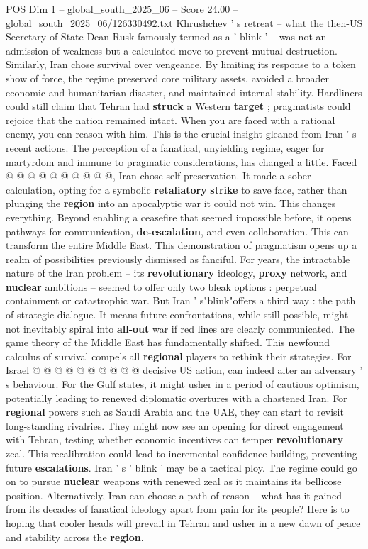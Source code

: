 \begin{textsample}{POS Dim 1 – global\_south\_2025\_06 – Score 24.00 – global\_south\_2025\_06/126330492.txt}
Khrushchev ' s retreat -- what the then-US Secretary of State Dean Rusk famously termed as a ' blink ' -- was not an admission of weakness but a calculated move to prevent mutual destruction.
Similarly, Iran chose survival over vengeance.
By limiting its response to a token show of force, the regime preserved core military assets, avoided a broader economic and humanitarian disaster, and maintained internal stability.
Hardliners could still claim that Tehran had \textbf{struck} a Western \textbf{target} ; pragmatists could rejoice that the nation remained intact.
When you are faced with a rational enemy, you can reason with him.
This is the crucial insight gleaned from Iran ' s recent actions.
The perception of a fanatical, unyielding regime, eager for martyrdom and immune to pragmatic considerations, has changed a little.
Faced @ @ @ @ @ @ @ @ @ @, Iran chose self-preservation.
It made a sober calculation, opting for a symbolic \textbf{retaliatory} \textbf{strike} to save face, rather than plunging the \textbf{region} into an apocalyptic war it could not win.
This changes everything.
Beyond enabling a ceasefire that seemed impossible before, it opens pathways for communication, \textbf{de-escalation}, and even collaboration.
This can transform the entire Middle East.
This demonstration of pragmatism opens up a realm of possibilities previously dismissed as fanciful.
For years, the intractable nature of the Iran problem -- its \textbf{revolutionary} ideology, \textbf{proxy} network, and \textbf{nuclear} ambitions -- seemed to offer only two bleak options : perpetual containment or catastrophic war.
But Iran ' s"blink"offers a third way : the path of strategic dialogue.
It means future confrontations, while still possible, might not inevitably spiral into \textbf{all-out} war if red lines are clearly communicated.
The game theory of the Middle East has fundamentally shifted.
This newfound calculus of survival compels all \textbf{regional} players to rethink their strategies.
For Israel @ @ @ @ @ @ @ @ @ @ decisive US action, can indeed alter an adversary ' s behaviour.
For the Gulf states, it might usher in a period of cautious optimism, potentially leading to renewed diplomatic overtures with a chastened Iran.
For \textbf{regional} powers such as Saudi Arabia and the UAE, they can start to revisit long-standing rivalries.
They might now see an opening for direct engagement with Tehran, testing whether economic incentives can temper \textbf{revolutionary} zeal.
This recalibration could lead to incremental confidence-building, preventing future \textbf{escalations}.
Iran ' s ' blink ' may be a tactical ploy.
The regime could go on to pursue \textbf{nuclear} weapons with renewed zeal as it maintains its bellicose position.
Alternatively, Iran can choose a path of reason -- what has it gained from its decades of fanatical ideology apart from pain for its people?
Here is to hoping that cooler heads will prevail in Tehran and usher in a new dawn of peace and stability across the \textbf{region}.


\end{textsample}
